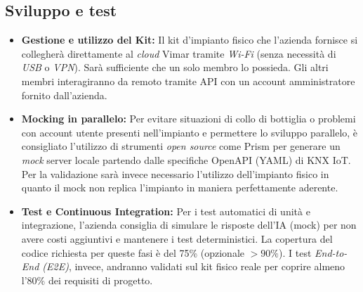 \documentclass[11pt, a4paper]{article}
\begin{document}
\subsection{ Sviluppo e test}
\begin{itemize}
    \item \textbf{Gestione e utilizzo del Kit:} Il kit d'impianto fisico che l'azienda fornisce si collegherà direttamente al \textit{cloud} Vimar tramite \textit{Wi-Fi} (senza necessità di \textit{USB} o \textit{VPN}). Sarà sufficiente che un solo membro lo possieda. Gli altri membri interagiranno da remoto tramite API con un account amministratore fornito dall'azienda.
    
   \item \textbf{Mocking in parallelo:} Per evitare situazioni di collo di bottiglia o problemi con account utente presenti nell'impianto e permettere lo sviluppo parallelo, è consigliato l'utilizzo di strumenti \textit{open source} come Prism per generare un \textit{mock} server locale partendo dalle specifiche OpenAPI (YAML) di KNX IoT. Per la validazione sarà invece necessario l'utilizzo dell'impianto fisico in quanto il mock non replica l'impianto in maniera perfettamente aderente.
    
    \item \textbf{Test e Continuous Integration:} Per i test automatici di unità e integrazione, l'azienda consiglia di simulare le risposte dell'IA (mock) per non avere costi aggiuntivi e mantenere i test deterministici. La copertura del codice richiesta per queste fasi è del 75\% (opzionale $>90\%$). I test \textit{End-to-End (E2E)}, invece, andranno validati sul kit fisico reale per coprire almeno l'80\% dei requisiti di progetto.
\end{itemize}
\end{document}
